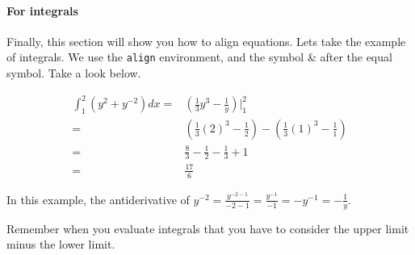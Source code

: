 \documentclass[11pt, oneside]{article}   	%
\begin{document}
\paragraph{For integrals} 

Finally, this section will show you how to align equations. Lets take the example of integrals. We use the \texttt{align} environment, and the symbol \& after the equal symbol. Take a look below.

\begin{align}
\int_{1}^{2} (y^{2}+y^{-2})dx =& (\frac{1}{3}y^{3}-\frac{1}{y})\Big|_{1}^{2}\\ %
=& (\frac{1}{3}(2)^{3}-\frac{1}{2})-(\frac{1}{3}(1)^{3}-\frac{1}{1})\\
=& \frac{8}{3}-\frac{1}{2}-\frac{1}{3}+1\\
=& \frac{17}{6}
\end{align}

In this example, the antiderivative of $y^{-2}=\frac{y^{-2-1}}{-2-1}=\frac{y^{-1}}{-1}=-y^{-1}=-\frac{1}{y}$.

Remember when you evaluate integrals that you have to consider the upper limit minus the lower limit. 
\end{document}
